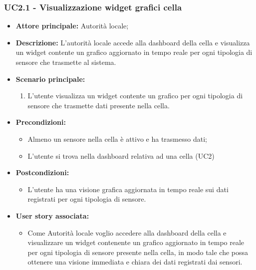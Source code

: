\documentclass{article}
\begin{document}
\subsubsection{UC2.1 - Visualizzazione widget grafici cella}
\begin{itemize}
    \item \textbf{Attore principale:} Autorità locale;
    \item \textbf{Descrizione:} L'autorità locale accede alla dashboard della cella e visualizza un widget contente un grafico aggiornato in tempo reale per ogni tipologia di sensore che trasmette al sistema.
    \item \textbf{Scenario principale:}
          \begin{enumerate}
              \item L'utente visualizza un widget contente un grafico per ogni tipologia di sensore che trasmette dati presente nella cella.
          \end{enumerate}
    \item \textbf{Precondizioni:}
          \begin{itemize}
              \item  Almeno un sensore nella cella è attivo e ha trasmesso dati;
              \item L'utente si trova nella dashboard relativa ad una cella (UC2)
          \end{itemize}
    \item \textbf{Postcondizioni:}
          \begin{itemize}
              \item      L'utente ha una visione grafica aggiornata in tempo reale sui dati registrati per ogni tipologia di sensore.
          \end{itemize}
    \item \textbf{User story associata:}
          \begin{itemize}
              \item Come Autorità locale voglio accedere alla dashboard della cella e visualizzare un widget contenente un grafico aggiornato in tempo reale per ogni tipologia di sensore presente nella cella,
                    in modo tale che possa ottenere una visione immediata e chiara dei dati registrati dai sensori.
          \end{itemize}
\end{itemize}
\end{document}
